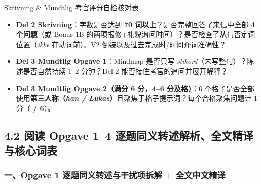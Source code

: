 \begin{tipbox}{Skrivning \& Mundtlig 考官评分自检核对表}
\small
\begin{itemize}
  \item \textbf{Del 2 Skrivning}：字数是否达到 \textbf{70 词以上}？是否完整回答了来信中全部 \textbf{4 个问题}（或 Bonus 1B 的两项报修+礼貌询问时间）？是否检查了从句否定词位置（\textit{ikke} 在动词前）、V2 倒装以及过去完成时/时间介词准确性？
  \item \textbf{Del 3 Mundtlig Opgave 1}：Mindmap 是否只写 \textit{stikord}（未写整句）？陈述是否自然持续 1--2 分钟？Del 2 能否接住考官的追问并展开解释？
  \item \textbf{Del 3 Mundtlig Opgave 2（满分 6 分，4--6 分及格）}：6 个格子是否全部使用\textbf{第三人称（\textit{han / Lukas}）}且聚焦于格子提示词？每个合格聚焦问题计 1 分（\textbf{\underline{\hspace{0.6cm}} / 6}）。
\end{itemize}
\end{tipbox}

\subsection*{4.2 阅读 Opgave 1--4 逐题同义转述解析、全文精译与核心词表}

\subsubsection*{一、Opgave 1 逐题同义转述与干扰项拆解 + 全文中文精译}

